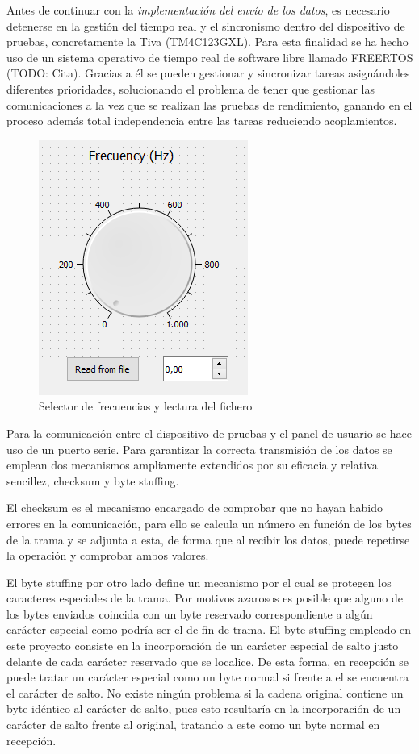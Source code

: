         Antes de continuar con la \textit{implementación del envío de los datos}, es necesario detenerse en la gestión del tiempo real y el sincronismo dentro del dispositivo de pruebas, concretamente la Tiva (TM4C123GXL). Para esta finalidad se ha hecho uso de un sistema operativo de tiempo real de software libre llamado FREERTOS (TODO: Cita). Gracias a él se pueden gestionar y sincronizar tareas asignándoles diferentes prioridades, solucionando el problema de tener que gestionar las comunicaciones a la vez que se realizan las pruebas de rendimiento, ganando en el proceso además total independencia entre las tareas reduciendo acoplamientos.
        
        \begin{figure}[H]
                \centering
                        \includegraphics[width =0.4\linewidth]{figuras/FrecKnob.png}
                \caption{Selector de frecuencias y lectura del fichero}
                \label{fig:frecKnob}
        \end{figure}

        Para la comunicación entre el dispositivo de pruebas y el panel de usuario se hace uso de un puerto serie. Para garantizar la correcta transmisión de los datos se emplean dos mecanismos ampliamente extendidos por su eficacia y relativa sencillez, checksum y byte stuffing. 
        
        El checksum es el mecanismo encargado de comprobar que no hayan habido errores en la comunicación, para ello se calcula un número en función de los bytes de la trama y se adjunta a esta, de forma que al recibir los datos, puede repetirse la operación y comprobar ambos valores. 
        
        El byte stuffing por otro lado define un mecanismo por el cual se protegen los caracteres especiales de la trama. Por motivos azarosos es posible que alguno de los bytes enviados coincida con un byte reservado correspondiente a algún carácter especial  como podría ser el de fin de trama. El byte stuffing empleado en este proyecto consiste en la incorporación de un carácter especial de salto justo delante de cada carácter reservado que se localice. De esta forma, en recepción se puede tratar un carácter especial como un byte normal si frente a el se encuentra el carácter de salto. No existe ningún problema si la cadena original contiene un byte idéntico al carácter de salto, pues esto resultaría en la incorporación de un carácter de salto frente al original, tratando a este como un byte normal en recepción.
        
